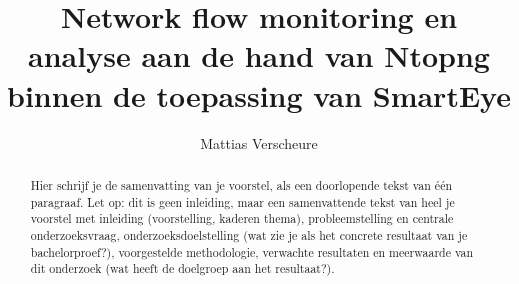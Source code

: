 \documentclass{hogent-article}
\title{Network flow monitoring en analyse aan de hand van Ntopng binnen de toepassing van SmartEye}
\author{Mattias Verscheure}
\begin{document}
\begin{abstract}
  Hier schrijf je de samenvatting van je voorstel, als een doorlopende tekst van één paragraaf. Let op: dit is geen inleiding, maar een samenvattende tekst van heel je voorstel met inleiding (voorstelling, kaderen thema), probleemstelling en centrale onderzoeksvraag, onderzoeksdoelstelling (wat zie je als het concrete resultaat van je bachelorproef?), voorgestelde methodologie, verwachte resultaten en meerwaarde van dit onderzoek (wat heeft de doelgroep aan het resultaat?).
\end{abstract}

\tableofcontents



\printbibliography[heading=bibintoc]
\end{document}
